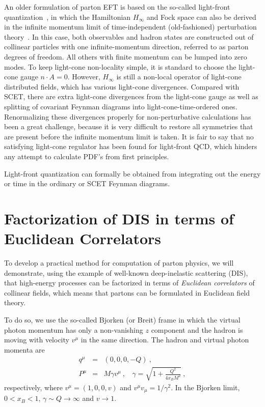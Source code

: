 \documentclass[prd,aps,twocolumn,preprintnumbers,showpacs,nofootinbib,superscriptaddress,notitlepage]{revtex4-1}
\begin{document}
An older formulation of parton EFT is based on the so-called light-front quantization~\cite{Dirac:1949cp,Brodsky:1997de}, in which the Hamiltonian $H_\infty$ and Fock space can also be derived in the infinite momentum limit of time-independent (old-fashioned) perturbation theory~\cite{Weinberg:1966jm}.
In this case, both observables and hadron states are constructed out of collinear particles with one infinite-momentum direction, referred to as parton degrees of freedom. All others with finite momentum can be lumped into zero modes. To keep light-cone non-locality simple, it is standard to choose the light-cone gauge $n\cdot A=0$. However, $H_\infty$ is still a non-local operator of light-cone distributed fields, which has various light-cone divergences. Compared with SCET, there are extra light-cone divergences from the light-cone gauge as well as splitting of covariant Feynman diagrams into light-cone-time-ordered ones. Renormalizing these divergences properly for non-perturbative calculations has been a great challenge, because it is very difficult to restore all symmetries that are present before the infinite momentum limit is taken. It is fair to say that no satisfying light-cone regulator has been found for light-front QCD, which hinders any attempt to calculate PDF's from first principles. 

Light-front quantization can formally be obtained from integrating out the energy or time in the ordinary or SCET Feynman diagrams. 

\section{Factorization of DIS in terms
of Euclidean Correlators}

To develop a practical method for computation of parton physics, 
we will demonstrate, using the example of well-known 
deep-inelastic scattering (DIS), that high-energy processes 
can be factorized in terms of {\it Euclidean correlators} of collinear fields, which means that partons can be formulated in Euclidean field theory. 

To do so, we use the so-called Bjorken (or Breit) frame in which 
the virtual photon momentum has only a non-vanishing $z$ component and the hadron is moving with velocity $v^\mu$ in the same direction. The hadron and virtual photon momenta are
\begin{eqnarray*}
   q^\mu &=& (0,0,0,-Q) \ , \nonumber \\
   P^\mu &=& M\gamma v^\mu \ ,~~~~ \gamma = \sqrt{1+\frac{Q^2}{4x_BM^2}}  \ ,   
\end{eqnarray*}
respectively, where $v^\mu =  (1, 0,0,v)$ and $v^\mu v_\mu =1/\gamma^2$. In the Bjorken limit, $0<x_B<1$, $\gamma\sim Q\to \infty$ and $v\to 1$.
\end{document}
